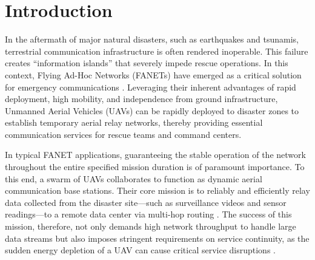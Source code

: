 \documentclass[runningheads]{llncs}
\begin{document}
\section{Introduction}
In the aftermath of major natural disasters, such as earthquakes and tsunamis, terrestrial communication infrastructure is often rendered inoperable. This failure creates ``information islands'' that severely impede rescue operations. In this context, Flying Ad-Hoc Networks (FANETs) have emerged as a critical solution for emergency communications \cite{intro3}. Leveraging their inherent advantages of rapid deployment, high mobility, and independence from ground infrastructure, Unmanned Aerial Vehicles (UAVs) can be rapidly deployed to disaster zones to establish temporary aerial relay networks, thereby providing essential communication services for rescue teams and command centers.

In typical FANET applications, guaranteeing the stable operation of the network throughout the entire specified mission duration is of paramount importance. To this end, a swarm of UAVs collaborates to function as dynamic aerial communication base stations. Their core mission is to reliably and efficiently relay data collected from the disaster site—such as surveillance videos and sensor readings—to a remote data center via multi-hop routing \cite{intro4}. The success of this mission, therefore, not only demands high network throughput to handle large data streams but also imposes stringent requirements on service continuity, as the sudden energy depletion of a UAV can cause critical service disruptions \cite{intro11}.
\end{document}
